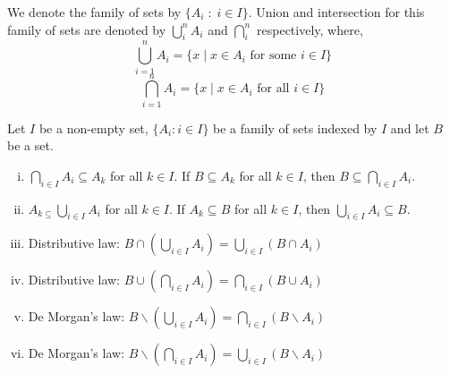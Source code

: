 \documentclass[a4paper,english,12pt]{article}
\begin{document}
We denote the family of sets by $\{A_{i} \;:\; i \in I\}$. Union and intersection for this family of sets are denoted by $\bigcup_{i}^{n}A_{i}$
and $\bigcap_{i}^{n}$ respectively, where,
\begin{equation*}
 \bigcup_{i = 1}^{n}A_{i} = \{x \; | \; x \in A_{i} \text{ for some } i \in I \}
 \nonumber
\end{equation*}
\begin{equation*}
 \bigcap_{i = 1}^{n}A_{i} = \{x \; | \; x \in A_{i} \text{ for all } i \in I \}
 \nonumber
\end{equation*}

\begin{thm}
Let $I$ be a non-empty set, $\{ A_{i} : i \in I \}$ be a family of sets indexed by $I$ and let $B$ be a set.
\begin{enumerate}[i)]
 \item $\displaystyle \bigcap_{i \in I} A_{i}  \subseteq A_{k}$ for all $k \in I$. If $B \subseteq A_{k}$ for all $k \in I$, then $B\displaystyle \subseteq \bigcap_{i \in I}A_{i}$.
 \item $A_{k \subseteq} \displaystyle \bigcup_{i \in I} A_{i}$ for all $k \in I$. If $A_{k} \subseteq B$ for all $k \in I$, then $\displaystyle \bigcup_{i \in I}A_{i} \subseteq B$. \\
 \item Distributive law: $\displaystyle B \cap \left( \bigcup_{i \in I}A_{i} \right) = \bigcup_{i \in I} \left( B \cap A_{i} \right)$
 \item Distributive law: $\displaystyle B \cup \left( \bigcap_{i \in I}A_{i} \right) = \bigcap_{i \in I} \left( B \cup A_{i} \right)$
 \item De Morgan's law: $B \backslash \left( \bigcup_{i \in I}A_{i} \right) = \bigcap_{i \in I} \left( B \backslash A_{i} \right)$
 \item De Morgan's law: $B \backslash \left(\bigcap_{i \in I}A_{i} \right) = \bigcup_{i \in I} \left( B \backslash A_{i} \right)$
 \end{enumerate}
\end{thm}
\end{document}
